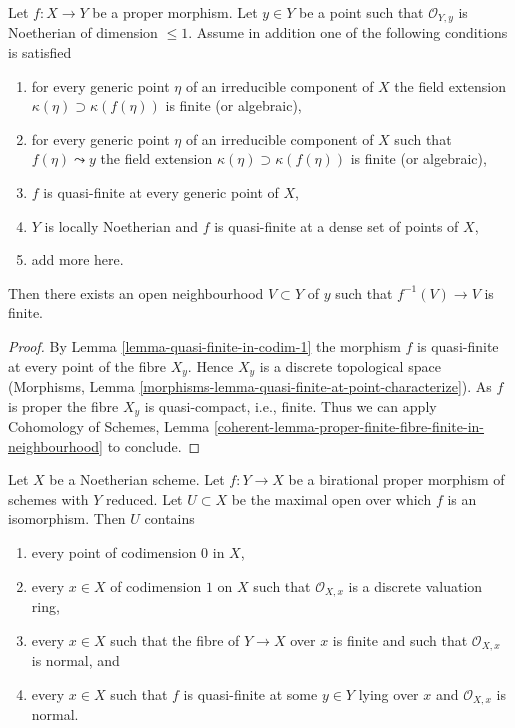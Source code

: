\begin{lemma}
\label{lemma-finite-in-codim-1}
Let $f : X \to Y$ be a proper morphism. Let $y \in Y$ be a point
such that $\mathcal{O}_{Y, y}$ is Noetherian of dimension $\leq 1$.
Assume in addition one of the following conditions is satisfied
\begin{enumerate}
\item for every generic point $\eta$ of an irreducible component
of $X$ the field extension $\kappa(\eta) \supset \kappa(f(\eta))$
is finite (or algebraic),
\item for every generic point $\eta$ of an irreducible component
of $X$ such that $f(\eta) \leadsto y$ the field extension
$\kappa(\eta) \supset \kappa(f(\eta))$ is finite (or algebraic),
\item $f$ is quasi-finite at every generic point of $X$,
\item $Y$ is locally Noetherian and $f$
is quasi-finite at a dense set of points of $X$,
\item add more here.
\end{enumerate}
Then there exists an open neighbourhood $V \subset Y$ of $y$ such that
$f^{-1}(V) \to V$ is finite.
\end{lemma}

\begin{proof}
By Lemma \ref{lemma-quasi-finite-in-codim-1} the morphism $f$ is
quasi-finite at every point of the fibre $X_y$. Hence
$X_y$ is a discrete topological space
(Morphisms, Lemma \ref{morphisms-lemma-quasi-finite-at-point-characterize}).
As $f$ is proper the fibre $X_y$ is quasi-compact, i.e., finite.
Thus we can apply Cohomology of Schemes, Lemma
\ref{coherent-lemma-proper-finite-fibre-finite-in-neighbourhood}
to conclude.
\end{proof}

\begin{lemma}
\label{lemma-modification-normal-iso-over-codimension-1}
Let $X$ be a Noetherian scheme. Let $f : Y \to X$ be a birational proper
morphism of schemes with $Y$ reduced. Let $U \subset X$ be the
maximal open over which $f$ is an isomorphism. Then $U$ contains
\begin{enumerate}
\item every point of codimension $0$ in $X$,
\item every $x \in X$ of codimension $1$ on $X$ such that
$\mathcal{O}_{X, x}$ is a discrete valuation ring,
\item every $x \in X$ such that the fibre of $Y \to X$ over $x$ is
finite and such that $\mathcal{O}_{X, x}$ is normal, and
\item every $x \in X$ such that $f$ is quasi-finite at some
$y \in Y$ lying over $x$ and $\mathcal{O}_{X, x}$ is normal.
\end{enumerate}
\end{lemma}

